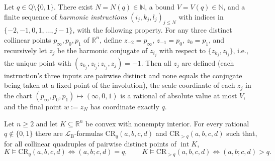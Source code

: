 \documentclass[10pt,a4paper]{amsart}
\newcommand{\LB}{\mathcal{L}_{\mathrm{B}}}
\newcommand{\Q}{\mathbb{Q}}
\newcommand{\R}{\mathbb{R}}
\newcommand{\interior}{\operatorname{int}}
\begin{document}
\begin{lemma}
\label{lem:net}
Let $q\in\Q\setminus\{0,1\}$. There exist $N=N(q)\in\mathbb{N}$, a bound
$V=V(q)\in\mathbb{N}$, and a finite sequence of \emph{harmonic instructions}
$(i_j,k_j,l_j)_{j\le N}$ with indices in $\{-2,-1,0,1,\dots,j-1\}$, with the
following property. For any three distinct collinear points $p_\infty,p_0,p_1$
of $\R^n$, define $z_{-2}=p_\infty$, $z_{-1}=p_0$, $z_0=p_1$, and
recursively let $z_j$ be the harmonic conjugate of $z_{i_j}$ with respect to
$\{z_{k_j},z_{l_j}\}$, i.e., the unique point with
$(z_{k_j},z_{l_j};z_{i_j},z_j)=-1$. Then all $z_j$ are defined \textup(each
instruction's three inputs are pairwise distinct and none equals the conjugate
being taken at a fixed point of the involution\textup), the scale coordinate
of each $z_j$ in the chart $(p_\infty,p_0,p_1)\mapsto(\infty,0,1)$ is a
rational of absolute value at most $V$, and the final point $w:=z_N$ has
coordinate exactly $q$.
\end{lemma}

\begin{proposition}\label{prop:crq}
Let $n\ge2$ and let $K\subseteq\R^n$ be convex with nonempty interior. For
every rational $q\notin\{0,1\}$ there are $\LB$-formulas
$\mathrm{CR}_q(a,b,c,d)$ and $\mathrm{CR}_{>q}(a,b,c,d)$ such that, for all
collinear quadruples of pairwise distinct points of $\interior K$,
\[
K\models\mathrm{CR}_q(a,b,c,d)\iff(a,b;c,d)=q,
\qquad
K\models\mathrm{CR}_{>q}(a,b,c,d)\iff(a,b;c,d)>q .
\]
\end{proposition}
\end{document}
